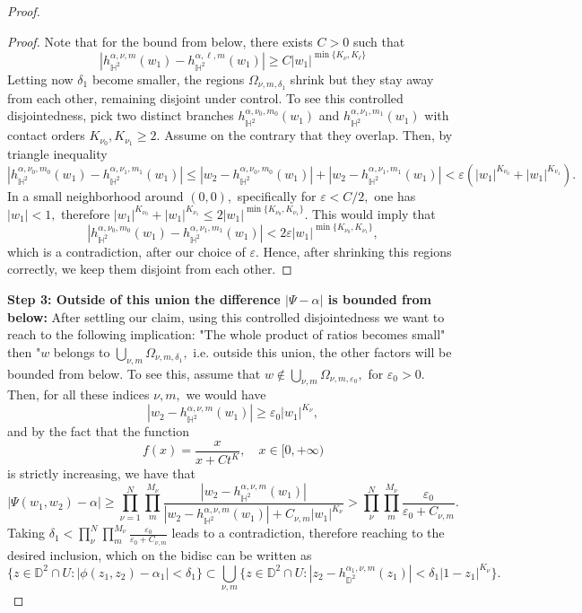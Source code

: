 \documentclass[12pt]{amsart}
\numberwithin{equation}{section}
\begin{document}
\begin{proof}
\begin{proof}
 Note that for the bound from below, there exists $C>0$ such that
 $$|h^{\alpha,\nu,m}_{\mathbb{H}^2}(w_1)-h^{\alpha,\ell,m}_{\mathbb{H}^2}(w_1)|\ge C |w_1|^{\min\{K_\nu,K_\ell\}}$$
 Letting now $\delta_1$ become smaller, the regions $\Omega_{\nu,m,\delta_1}$ shrink but they stay away from each other, remaining disjoint under control.
 To see this controlled disjointedness, pick two distinct branches $h^{\alpha,\nu_0,m_0}_{\mathbb{H}^2}(w_1)$ and $h^{\alpha,\nu_1,m_1}_{\mathbb{H}^2}(w_1)$ with contact orders $K_{\nu_0},K_{\nu_1}\ge2.$ Assume on the contrary that they overlap. Then, by triangle inequality
 $$|h^{\alpha,\nu_0,m_0}_{\mathbb{H}^2}(w_1)-h^{\alpha,\nu_1,m_1}_{\mathbb{H}^2}(w_1)|\leq|w_2-h^{\alpha,\nu_0,m_0}_{\mathbb{H}^2}(w_1)|+|w_2-h^{\alpha,\nu_1,m_1}_{\mathbb{H}^2}(w_1)|<\varepsilon(|w_1|^{K_{\nu_0}}+|w_1|^{K_{\nu_1}}).$$
 In a small neighborhood around $(0,0),$ specifically for $\varepsilon<C/2,$ one has $|w_1|<1,$ therefore $|w_1|^{K_{\nu_0}}+|w_1|^{K_{\nu_1}}\leq 2|w_1|^{\min\{K_{\nu_0},K_{\nu_1}\}}.$
 This would imply that 
 $$|h^{\alpha,\nu_0,m_0}_{\mathbb{H}^2}(w_1)-h^{\alpha,\nu_1,m_1}_{\mathbb{H}^2}(w_1)|<2\varepsilon|w_1|^{\min\{K_{\nu_0},K_{\nu_1}\}},$$ which is a contradiction, after our choice of $\varepsilon.$ Hence, after shrinking this regions correctly, we keep them disjoint from each other.
 \end{proof}
\textbf{Step 3: Outside of this union the difference $|\Psi-\alpha|$ is bounded from below:}
 After settling our claim, using this controlled disjointedness we want to reach to the following implication: "The whole product of ratios becomes small" then "$w$ belongs to $\bigcup_{\nu,m}\Omega_{\nu,m,\delta_1},$ i.e. outside this union, the other factors will be bounded from below. To see this, assume that $w\not\in\bigcup_{\nu,m}\Omega_{\nu,m,\varepsilon_0},$ for $\varepsilon_0>0.$ Then, for all these indices $\nu,m,$ we would have $$|w_2-h^{\alpha,\nu,m}_{\mathbb{H}^2}(w_1)|\ge \varepsilon_0|w_1|^{K_{\nu}},$$ and by the fact that the function $$f(x)=\frac{x}{x+Ct^K},\quad x\in [0,+\infty)$$ is strictly increasing, we have that 
 $$|\Psi(w_1,w_2)-\alpha|\ge \prod_{\nu=1}^N\prod_{m}^{M_\nu}\frac{|w_2-h^{\alpha,\nu,m}_{\mathbb{H}^2}(w_1)|}{|w_2-h^{\alpha,\nu,m}_{\mathbb{H}^2}(w_1)|+C_{\nu,m}|w_1|^{K_{\nu}}}>\prod_{\nu}^N\prod_{m}^{M_\nu}\frac{\varepsilon_0}{\varepsilon_0+C_{\nu,m}}.$$
 Taking $\delta_1<\prod_{\nu}^N\prod_{m}^{M_\nu}\frac{\varepsilon_0}{\varepsilon_0+C_{\nu,m}}$ leads to a contradiction, therefore reaching to the desired inclusion, which on the bidisc can be written as $$\bigg\{z\in\mathbb{D}^2\cap U:|\phi(z_1,z_2)-\alpha_1|<\delta_1\bigg\} \subset \bigcup_{\nu,m}\bigg\{z\in\mathbb{D}^2\cap U:|z_2-h^{\alpha_1,\nu,m}_{\mathbb{D}^2}(z_1)|<\delta_1|1-z_1|^{K_{\nu}}\bigg\}.$$ 


\end{proof}
\end{document}
